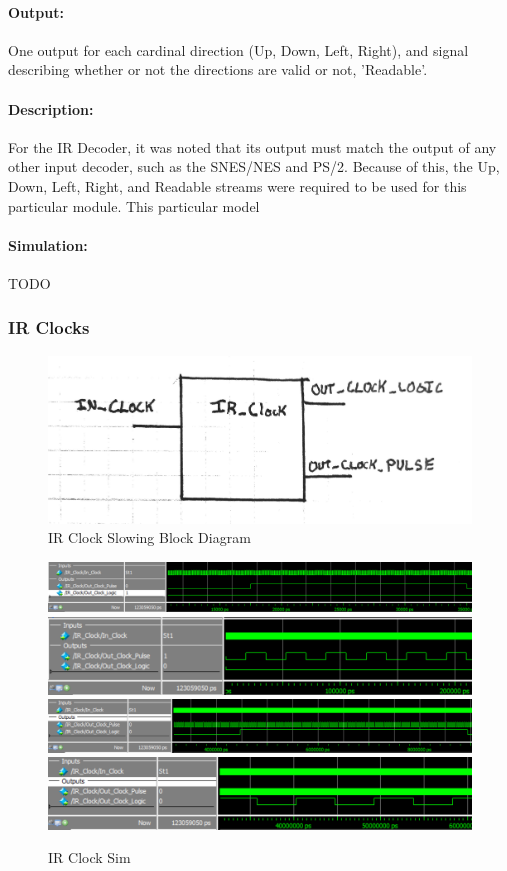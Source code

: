 \documentclass[]{article}
\begin{document}
\paragraph{Output:} One output for each cardinal direction (Up, Down, Left, Right), and signal describing whether or not the directions are valid or not, 'Readable'.
\paragraph{Description:} For the IR Decoder, it was noted that its output must match the output of any other input decoder, such as the SNES/NES and PS/2.
Because of this, the Up, Down, Left, Right, and Readable streams were required to be used for this particular module. This particular model 
\paragraph{Simulation:} TODO

\subsubsection{IR Clocks}
\begin{figure}[H]\centering
    \includegraphics[width=0.9\linewidth]{figures/IR_Clock_Block.jpg}
    \caption{IR Clock Slowing Block Diagram}
    \label{fig:irClockBlock}
\end{figure}
\begin{figure}[H]\centering
    \includegraphics[width=\linewidth]{figures/IR_Clock_Sim1}
    \includegraphics[width=\linewidth]{figures/IR_Clock_Sim2}
    \includegraphics[width=\linewidth]{figures/IR_Clock_Sim3}
    \includegraphics[width=\linewidth]{figures/IR_Clock_Sim4}
    \caption{IR Clock Sim}
    \label{fig:asyncIRData}
\end{figure}
\end{document}
